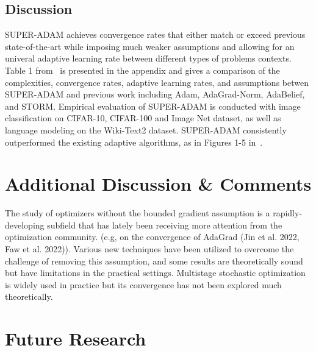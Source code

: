 \documentclass{article}
\begin{document}
\subsection{Discussion}
SUPER-ADAM achieves convergence rates that either match or exceed previous state-of-the-art while imposing much weaker assumptions and allowing for an univeral adaptive learning rate between different types of problems contexts.
Table 1 from~\cite{https://doi.org/10.48550/arxiv.2106.08208} is presented in the appendix and gives a comparison of the complexities, convergence rates, adaptive learning rates, and assumptions betwen SUPER-ADAM and previous work including Adam, AdaGrad-Norm, AdaBelief, and STORM.
Empirical evaluation of SUPER-ADAM is conducted with image classification on CIFAR-10, CIFAR-100 and Image Net dataset, as well as language modeling on the Wiki-Text2 dataset. SUPER-ADAM consistently outperformed the existing adaptive algorithms,
as in Figures 1-5 in~\cite{https://doi.org/10.48550/arxiv.2106.08208}.
\section{Additional Discussion \& Comments}
The study of optimizers without the bounded gradient assumption is a rapidly-developing subfield that has lately been receiving more attention from the optimization community. (e.g, on the convergence of AdaGrad (Jin et al. 2022, Faw et al. 2022)).
Various new techniques have been utilized to overcome the challenge of removing this assumption, and some results are theoretically sound but have limitations in the practical settings. Multistage stochastic optimization is widely used in practice but its convergence has not been explored much theoretically.
\section{Future Research}
\newpage


%
\newpage
\appendix
\end{document}
